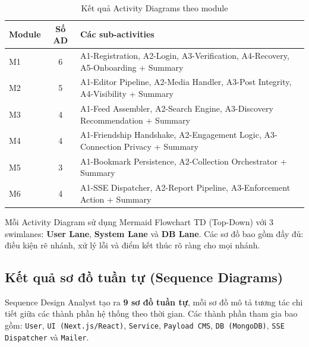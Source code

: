 \documentclass[13pt,a4paper,oneside]{extreport}
\numberwithin{equation}{chapter}
\numberwithin{figure}{chapter}
\numberwithin{table}{chapter}
\begin{document}
\begin{table}[H]
\centering
\caption{Kết quả Activity Diagrams theo module}
\label{tab:activity-results}
\begin{tabular}{|p{1cm}|c|p{8cm}|}
\hline
\textbf{Module} & \textbf{Số AD} & \textbf{Các sub-activities} \\
\hline
M1 & 6 & A1-Registration, A2-Login, A3-Verification, A4-Recovery, A5-Onboarding + Summary \\
\hline
M2 & 5 & A1-Editor Pipeline, A2-Media Handler, A3-Post Integrity, A4-Visibility + Summary \\
\hline
M3 & 4 & A1-Feed Assembler, A2-Search Engine, A3-Discovery Recommendation + Summary \\
\hline
M4 & 4 & A1-Friendship Handshake, A2-Engagement Logic, A3-Connection Privacy + Summary \\
\hline
M5 & 3 & A1-Bookmark Persistence, A2-Collection Orchestrator + Summary \\
\hline
M6 & 4 & A1-SSE Dispatcher, A2-Report Pipeline, A3-Enforcement Action + Summary \\
\hline
\end{tabular}
\end{table}

Mỗi Activity Diagram sử dụng Mermaid Flowchart TD (Top-Down) với 3 swimlanes: \textbf{User Lane}, \textbf{System Lane} và \textbf{DB Lane}. Các sơ đồ bao gồm đầy đủ: điều kiện rẽ nhánh, xử lý lỗi và điểm kết thúc rõ ràng cho mọi nhánh.

\subsection{Kết quả sơ đồ tuần tự (Sequence Diagrams)}

Sequence Design Analyst tạo ra \textbf{9 sơ đồ tuần tự}, mỗi sơ đồ mô tả tương tác chi tiết giữa các thành phần hệ thống theo thời gian. Các thành phần tham gia bao gồm: \texttt{User}, \texttt{UI (Next.js/React)}, \texttt{Service}, \texttt{Payload CMS}, \texttt{DB (MongoDB)}, \texttt{SSE Dispatcher} và \texttt{Mailer}.
\end{document}
